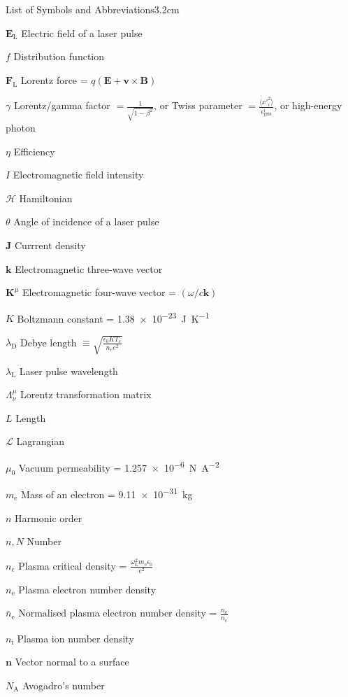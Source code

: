 \begin{mclistof}{List of Symbols and Abbreviations}{3.2cm}
\item[$\mathbf{E}_\mathrm{L}$] Electric field of a laser pulse
\item[$f$] Distribution function
\item[$\mathbf{F}_\mathrm{L}$] Lorentz force = $q(\mathbf{E}+ \mathbf{v}\times \mathbf{B})$
\item[$\gamma$] Lorentz/gamma factor $= \frac{1}{\sqrt{1-\beta^2}}$, or Twiss parameter $= \frac{\langle x'^2_i\rangle}{\epsilon^i_\mathrm{rms}}$, or high-energy photon
\item[$\eta$] Efficiency
\item[$I$] Electromagnetic field intensity
\item[$\mathcal{H}$] Hamiltonian
\item[$\theta$] Angle of incidence of a laser pulse
\item[$\mathbf{J}$] Currrent density
\item[$\mathbf{k}$] Electromagnetic three-wave vector
\item[$\mathbf{K}^\mu$] Electromagnetic four-wave vector = $(\omega/c \mathbf{k})$
\item[$K$] Boltzmann constant = \qty{1.38e-23}{J.K^{-1}}
\item[$\lambda_\mathrm{D}$] Debye length $\equiv \sqrt{\frac{\epsilon_0KT_e}{n_ee^2}}$
\item[$\lambda_\mathrm{L}$] Laser pulse wavelength
\item[$\Lambda^\mu_\nu$] Lorentz transformation matrix
\item[$L$] Length 
\item[$\mathcal{L}$] Lagrangian
\item[$\mu_0$] Vacuum permeability = \qty{1.257e-6}{N.A^{-2}}
\item[$m_\mathrm{e}$] Mass of an electron = \qty{9.11e-31}{kg}
\item[$n$] Harmonic order
\item[$n,N$] Number
\item[$n_\mathrm{c}$] Plasma critical density = $\frac{\omega^2_\mathrm{L}m_\mathrm{e}\epsilon_0}{e^2}$
\item[$n_\mathrm{e}$] Plasma electron number density
\item[$\bar{n}_\mathrm{e}$] Normalised plasma electron number density = $\frac{n_\mathrm{e}}{n_\mathrm{c}}$
\item[$n_\mathrm{i}$] Plasma ion number density
\item[$\mathbf{n}$] Vector normal to a surface
\item[$N_\mathrm{A}$] Avogadro's number

\end{mclistof}
